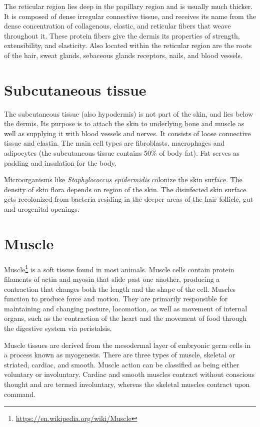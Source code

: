 \documentclass[]{book}
\let\rmarkdownfootnote\footnote%
\def\footnote{\protect\rmarkdownfootnote}
\renewcommand{\href}[2]{#2\footnote{\url{#1}}}
\begin{document}
The reticular region lies deep in the papillary region and is usually much thicker. It is composed of dense irregular connective tissue, and receives its name from the dense concentration of collagenous, elastic, and reticular fibers that weave throughout it. These protein fibers give the dermis its properties of strength, extensibility, and elasticity. Also located within the reticular region are the roots of the hair, sweat glands, sebaceous glands receptors, nails, and blood vessels.

\hypertarget{subcutaneous-tissue}{%
\section{Subcutaneous tissue}\label{subcutaneous-tissue}}

The subcutaneous tissue (also hypodermis) is not part of the skin, and lies below the dermis. Its purpose is to attach the skin to underlying bone and muscle as well as supplying it with blood vessels and nerves. It consists of loose connective tissue and elastin. The main cell types are fibroblasts, macrophages and adipocytes (the subcutaneous tissue contains 50\% of body fat). Fat serves as padding and insulation for the body.

Microorganisms like \emph{Staphylococcus epidermidis} colonize the skin surface. The density of skin flora depends on region of the skin. The disinfected skin surface gets recolonized from bacteria residing in the deeper areas of the hair follicle, gut and urogenital openings.

\hypertarget{muscle}{%
\section{Muscle}\label{muscle}}

\href{https://en.wikipedia.org/wiki/Muscle}{Muscle} is a soft tissue found in most animals. Muscle cells contain protein filaments of actin and myosin that slide past one another, producing a contraction that changes both the length and the shape of the cell. Muscles function to produce force and motion. They are primarily responsible for maintaining and changing posture, locomotion, as well as movement of internal organs, such as the contraction of the heart and the movement of food through the digestive system via peristalsis.

Muscle tissues are derived from the mesodermal layer of embryonic germ cells in a process known as myogenesis. There are three types of muscle, skeletal or striated, cardiac, and smooth. Muscle action can be classified as being either voluntary or involuntary. Cardiac and smooth muscles contract without conscious thought and are termed involuntary, whereas the skeletal muscles contract upon command.
\end{document}

